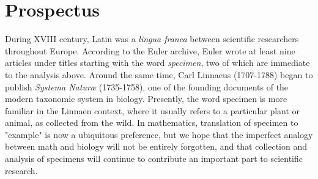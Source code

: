 \documentclass[nofootinbib,preprint]{revtex4-1}
\begin{document}
\section{Prospectus}
During XVIII century, Latin was a \textit{lingua franca} between scientific researchers 
throughout Europe. According to the Euler archive, Euler wrote at least nine articles 
under titles starting with the word \textit{specimen}, two of which are immediate 
to the analysis above. Around the same time, Carl Linnaeus (1707-1788) began to publish
\textit{Systema Natur\ae} (1735-1758), one of the founding documents of the modern 
taxonomic system in biology. Presently, the word specimen is more familiar in the 
Linnaen context, where it usually refers to a particular plant or animal, 
as collected from the wild. In mathematics, translation of specimen to "example" 
is now a ubiquitous preference, but we hope that the imperfect analogy between math 
and biology will not be entirely forgotten, and that collection and analysis of 
specimens will continue to contribute an important part to scientific research. 
\end{document}
